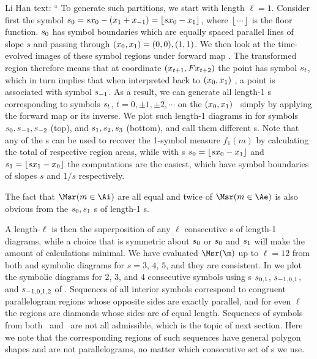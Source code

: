 \begin{description}
Li Han text: ``
To generate such {\statesp} partitions, we start with length $\ell=1$. Consider
first the symbol ${s_{0}} = s x_0 - (x_1 + x_{-1}) =
\left\lfloor s x_0 - x_1 \right\rfloor$, where $\left\lfloor \cdots
\right\rfloor$ is the floor function. ${s_{0}}$ has symbol boundaries
which are equally spaced parallel lines of slope $s$ and passing through
$(x_0, x_1) = (0, 0), (1, 1)$. We then look at the time-evolved
images of these symbol regions under forward map .
The transformed region therefore means that at coordinate $(x_{t+1},F
x_{t+2})$ the point has symbol ${s_{t}}$, which in turn implies that
when interpreted back to $(x_{0},x_{1})$  \statesp, a point is
associated with symbol ${s_{-1}}$. As a result, we can generate all
length-1 {\statesp s} corresponding to symbols ${s_{t}}$, $t = 0, \pm1,
\pm2, \cdots$ on the $(x_{0},x_{1})$  \statesp\ simply by applying
the forward map  or its inverse. We plot such
length-1 diagrams in  for symbols ${s_{0}},
{s_{-1}}, {s_{-2}}$ (top), and ${s_{1}}, {s_{2}}, {s_{3}}$ (bottom),
and call them different {\brick s}. Note that any of the {\brick s} can be used
to recover the 1-symbol measure $f_1(m)$ by calculating the total of
respective region areas, while with {\brick s} ${s_{0}} = \left\lfloor s
x_0 - x_1 \right\rfloor$ and ${s_{1}} = \left\lfloor s x_1 -
x_0 \right\rfloor$ the computations are the easiest, which have symbol
boundaries of slopes $s$ and $1/s$ respectively.

The fact that $\Msr(m
\in \Ai)$ are all equal and twice of $\Msr(m \in \Ae)$ is also obvious
from the ${s_{0}}, {s_{1}}$ {\brick s} of length-1 {\statesp s}.

A length-$\ell$ {\statesp} is then the superposition of any $\ell$
consecutive {\brick s} of length-1 diagrams, while a choice that is
symmetric about {\brick} ${s_{0}}$ or ${s_{0}}$ and ${s_{1}}$ will
make the amount of calculations minimal. We have evaluated $\Msr(\m)$ up
to $\ell = 12$ from both  and symbolic diagrams for
$s=3$, $4$, $5$, and they are consistent. In 
we plot the symbolic diagrams for 2, 3, and 4 consecutive symbols using
{\brick s} ${s_{0,1}}$, ${s_{-1,0,1}}$, and ${s_{-1,0,1,2}}$ of
. Sequences of all interior symbols
correspond to congruent parallelogram regions whose opposite sides are
exactly parallel, and for even $\ell$ the regions are diamonds whose
sides are of equal length. Sequences of symbols from both \Ai\ and \Ae\
are not all admissible, which is the topic of next section. Here we note
that the corresponding regions of such sequences have general polygon
shapes and are not parallelograms, no matter which consecutive set of
{\brick s} we use.


\end{description}
